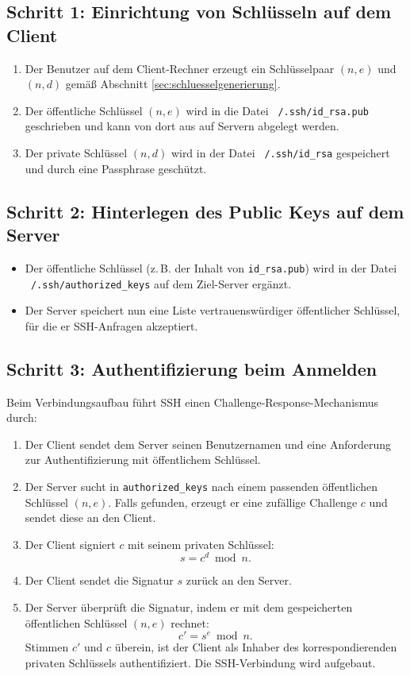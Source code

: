 \documentclass[a4paper,11pt]{article}
\begin{document}
\subsection{Schritt 1: Einrichtung von Schlüsseln auf dem Client}
\begin{enumerate}
  \item Der Benutzer auf dem Client-Rechner erzeugt ein Schlüsselpaar \((n, e)\) und \((n, d)\) gemäß Abschnitt \ref{sec:schluesselgenerierung}.
  \item Der öffentliche Schlüssel \((n, e)\) wird in die Datei \texttt{~/.ssh/id\_rsa.pub} geschrieben und kann von dort aus auf Servern abgelegt werden.
  \item Der private Schlüssel \((n, d)\) wird in der Datei \texttt{~/.ssh/id\_rsa} gespeichert und durch eine Passphrase geschützt.
\end{enumerate}

\subsection{Schritt 2: Hinterlegen des Public Keys auf dem Server}
\begin{itemize}
  \item Der öffentliche Schlüssel (z.\,B. der Inhalt von \texttt{id\_rsa.pub}) wird in der Datei \texttt{~/.ssh/authorized\_keys} auf dem Ziel-Server ergänzt.
  \item Der Server speichert nun eine Liste vertrauenswürdiger öffentlicher Schlüssel, für die er SSH-Anfragen akzeptiert.
\end{itemize}

\subsection{Schritt 3: Authentifizierung beim Anmelden}
Beim Verbindungsaufbau führt SSH einen Challenge-Response-Mechanismus durch:
\begin{enumerate}
  \item Der Client sendet dem Server seinen Benutzernamen und eine Anforderung zur Authentifizierung mit öffentlichem Schlüssel.
  \item Der Server sucht in \texttt{authorized\_keys} nach einem passenden öffentlichen Schlüssel \((n,e)\). Falls gefunden, erzeugt er eine zufällige Challenge \(c\) und sendet diese an den Client.
  \item Der Client signiert \(c\) mit seinem privaten Schlüssel:
    \[
      s = c^d \bmod n.
    \]
  \item Der Client sendet die Signatur \(s\) zurück an den Server.
  \item Der Server überprüft die Signatur, indem er mit dem gespeicherten öffentlichen Schlüssel \((n,e)\) rechnet:
    \[
      c' = s^e \bmod n.
    \]
    Stimmen \(c'\) und \(c\) überein, ist der Client als Inhaber des korrespondierenden privaten Schlüssels authentifiziert. Die SSH-Verbindung wird aufgebaut.
\end{enumerate}
\end{document}
